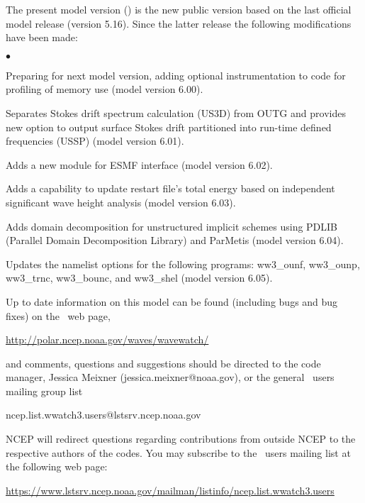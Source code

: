 \vspace{\baselineskip} 
\noindent 
The present model version (\WWver) is the new public version based on the
last official model release (version 5.16). Since the latter release the
following modifications have been made:

\begin{list}{$\bullet$}{\rightmargin 5mm \parsep 0mm \itemsep 0mm}

\item Preparing for next model version, adding optional instrumentation to code
      for profiling of memory use (model version 6.00).

\item Separates Stokes drift spectrum calculation (US3D) from OUTG and provides 
      new option to output surface Stokes drift partitioned into run-time defined 
      frequencies (USSP) (model version 6.01).  

\item Adds a new module for ESMF interface (model version 6.02). 

\item Adds a capability to update restart file's total energy based on independent 
      significant wave height analysis (model version 6.03).

\item Adds domain decomposition for unstructured implicit schemes using PDLIB
      (Parallel Domain Decomposition Library) and ParMetis (model version 6.04).

\item Updates the namelist options for the following programs: ww3\_ounf, ww3\_ounp, 
      ww3\_trnc, ww3\_bounc, and ww3\_shel (model version 6.05).

\end{list}

\vspace{\baselineskip} \noindent 
Up to date information on this model can be found (including bugs and bug
fixes) on the \ws\ web page, 
\begin{center}
\url{http://polar.ncep.noaa.gov/waves/wavewatch/}
\end{center}
and comments, questions and suggestions should be
directed to the code manager, Jessica Meixner (jessica.meixner@noaa.gov), or the general \ws\ users mailing group list

\begin{center}
ncep.list.wwatch3.users@lstsrv.ncep.noaa.gov
\end{center}

\noindent
NCEP will redirect questions regarding contributions from outside NCEP to the
respective authors of the codes. You may subscribe to the \ws\ users 
mailing list at the following web page:
\begin{center}
\footnotesize
\url{https://www.lstsrv.ncep.noaa.gov/mailman/listinfo/ncep.list.wwatch3.users}
\end{center} 

